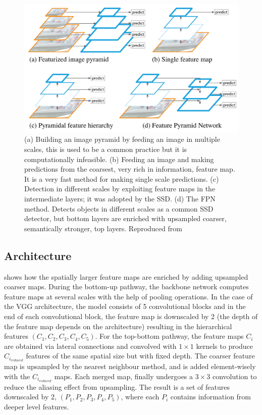 \begin{figure}[!htb]
  \centering
  \includegraphics[width=12cm]{../figures/ch2/fig9.png}
  \caption{(a) Building an image pyramid by feeding an image in multiple scales, this is used to be a common practice but it is computationally infeasible. (b) Feeding an image and making predictions from the coarsest, very rich in information, feature map. It is a very fast method for making single scale predictions. (c) Detection in different scales by exploiting feature maps in the intermediate layers; it was adopted by the SSD. (d) The FPN method. Detects objects in different scales as a common SSD detector, but bottom layers are enriched with upsampled coarser, semantically stronger, top layers. Reproduced from \cite{lin2017feature}}
  \label{fig9}
\end{figure} 

\subsection{Architecture}
 shows how the spatially larger feature maps are enriched by adding upsampled coarser maps. During the bottom-up pathway, the backbone network computes feature maps at several scales with the help of pooling operations. In the case of the VGG architecture, the model consists of 5 convolutional blocks and in the end of each convolutional block, the feature map is downscaled by 2 (the depth of the feature map depends on the architecture) resulting in the hierarchical features $(C_1, C_2, C_3, C_4, C_5)$. For the top-bottom pathway, the feature maps $C_i$ are obtained via lateral connections and convolved with $1\times1$ kernels to produce $C_{i_{reduced}}$ features of the same spatial size but with fixed depth. The coarser feature map is upsampled by the nearest neighbour method, and is added element-wisely with the $C_{i_{reduced}}$ maps. Each merged map, finally undergoes a $3\times3$ convolution to reduce the aliasing effect from upsampling. The result is a set of features downscaled by 2, $(P_1,P_2,P_3,P_4,P_5)$, where each $P_i$ contains information from deeper level features. 

